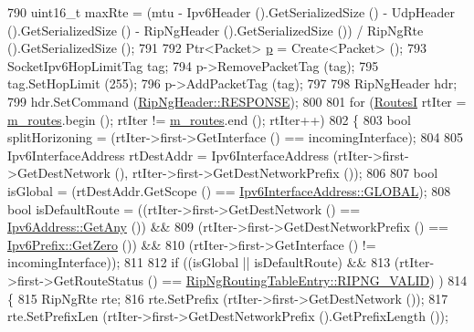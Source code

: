 \begin{DoxyCode}
790               uint16\_t maxRte = (mtu - Ipv6Header ().GetSerializedSize () - UdpHeader ().GetSerializedSize 
      () - RipNgHeader ().GetSerializedSize ()) / RipNgRte ().GetSerializedSize ();
791 
792               Ptr<Packet> \hyperlink{lte__link__budget_8m_ac9de518908a968428863f829398a4e62}{p} = Create<Packet> ();
793               SocketIpv6HopLimitTag tag;
794               p->RemovePacketTag (tag);
795               tag.SetHopLimit (255);
796               p->AddPacketTag (tag);
797 
798               RipNgHeader hdr;
799               hdr.SetCommand (\hyperlink{classns3_1_1RipNgHeader_ad96724d6f6fdb4ffa22fe71a0ff12bd2a787536902c0e1912fd0c234def4c32b7}{RipNgHeader::RESPONSE});
800 
801               \textcolor{keywordflow}{for} (\hyperlink{classns3_1_1RipNg_aa8bc6103d67089e1e3cd507936f94887}{RoutesI} rtIter = \hyperlink{classns3_1_1RipNg_acfc1011b140f9e612a8c27c9bfb4c6b5}{m\_routes}.begin (); rtIter != 
      \hyperlink{classns3_1_1RipNg_acfc1011b140f9e612a8c27c9bfb4c6b5}{m\_routes}.end (); rtIter++)
802                 \{
803                   \textcolor{keywordtype}{bool} splitHorizoning = (rtIter->first->GetInterface () == incomingInterface);
804 
805                   Ipv6InterfaceAddress rtDestAddr = Ipv6InterfaceAddress (rtIter->first->GetDestNetwork (),
       rtIter->first->GetDestNetworkPrefix ());
806 
807                   \textcolor{keywordtype}{bool} isGlobal = (rtDestAddr.GetScope () == 
      \hyperlink{classns3_1_1Ipv6InterfaceAddress_ad3f03debf9dae475b81ea9cdf81f4f27aaf504a3b8c1562206e6ba65b4a6cff1d}{Ipv6InterfaceAddress::GLOBAL});
808                   \textcolor{keywordtype}{bool} isDefaultRoute = ((rtIter->first->GetDestNetwork () == 
      \hyperlink{classns3_1_1Ipv6Address_a2783e8badfc98c8b0a8508bba6e1b91e}{Ipv6Address::GetAny} ()) &&
809                       (rtIter->first->GetDestNetworkPrefix () == 
      \hyperlink{classns3_1_1Ipv6Prefix_ab32d2dbadcd8fa048ff296cb0a0e34ff}{Ipv6Prefix::GetZero} ()) &&
810                       (rtIter->first->GetInterface () != incomingInterface));
811 
812                   \textcolor{keywordflow}{if} ((isGlobal || isDefaultRoute) &&
813                       (rtIter->first->GetRouteStatus () == 
      \hyperlink{classns3_1_1RipNgRoutingTableEntry_af723fc23e97afdd05c55da5162b7e673a334e33ca88fb2b8de53c814814d3c017}{RipNgRoutingTableEntry::RIPNG\_VALID}) )
814                     \{
815                       RipNgRte rte;
816                       rte.SetPrefix (rtIter->first->GetDestNetwork ());
817                       rte.SetPrefixLen (rtIter->first->GetDestNetworkPrefix ().GetPrefixLength ());

\end{DoxyCode}
